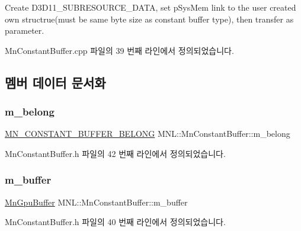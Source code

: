 Create D3\+D11\+\_\+\+S\+U\+B\+R\+E\+S\+O\+U\+R\+C\+E\+\_\+\+D\+A\+TA, set p\+Sys\+Mem link to the user created own structrue(must be same byte size as constant buffer type), then transfer as parameter. 

Mn\+Constant\+Buffer.\+cpp 파일의 39 번째 라인에서 정의되었습니다.



\subsection{멤버 데이터 문서화}
\mbox{\label{class_m_n_l_1_1_mn_constant_buffer_aaab10bc1257803aba45c924acab04c35}} 
\subsubsection{\texorpdfstring{m\+\_\+belong}{m\_belong}}
{\footnotesize\ttfamily \hyperlink{namespace_m_n_l_a3f526411258a17023ecac1a36e666d42}{M\+N\+\_\+\+C\+O\+N\+S\+T\+A\+N\+T\+\_\+\+B\+U\+F\+F\+E\+R\+\_\+\+B\+E\+L\+O\+NG} M\+N\+L\+::\+Mn\+Constant\+Buffer\+::m\+\_\+belong\hspace{0.3cm}{\ttfamily [private]}}



Mn\+Constant\+Buffer.\+h 파일의 42 번째 라인에서 정의되었습니다.

\mbox{\label{class_m_n_l_1_1_mn_constant_buffer_a1a9d69098ff55f524716d8415fe76e20}} 
\subsubsection{\texorpdfstring{m\+\_\+buffer}{m\_buffer}}
{\footnotesize\ttfamily \hyperlink{class_m_n_l_1_1_mn_gpu_buffer}{Mn\+Gpu\+Buffer} M\+N\+L\+::\+Mn\+Constant\+Buffer\+::m\+\_\+buffer\hspace{0.3cm}{\ttfamily [private]}}



Mn\+Constant\+Buffer.\+h 파일의 40 번째 라인에서 정의되었습니다.

